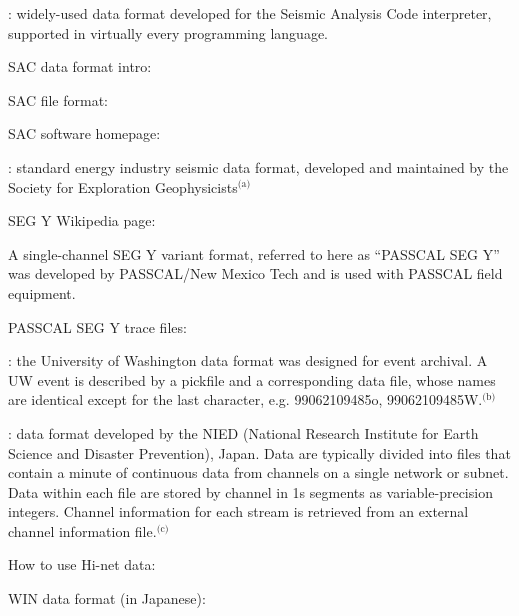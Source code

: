 \documentclass[letterpaper,11pt,english]{sphinxmanual}
\begin{document}
: widely-used data format developed for the Seismic Analysis Code interpreter, supported in virtually every programming language. %
\begin{footnote}[2]\sphinxAtStartFootnote
SAC data format intro: 
%
\end{footnote} %
\begin{footnote}[3]\sphinxAtStartFootnote
SAC file format: 
%
\end{footnote} %
\begin{footnote}[4]\sphinxAtStartFootnote
SAC software homepage: 
%
\end{footnote}

: standard energy industry seismic data format, developed and maintained by the Society for Exploration Geophysicists$^{\text{(a)}}$ %
\begin{footnote}[5]\sphinxAtStartFootnote
SEG Y Wikipedia page: 
%
\end{footnote} A single-channel SEG Y variant format, referred to here as “PASSCAL SEG Y” was developed by PASSCAL/New Mexico Tech and is used with PASSCAL field equipment. %
\begin{footnote}[6]\sphinxAtStartFootnote
PASSCAL SEG Y trace files: 
%
\end{footnote}

: the University of Washington data format was designed for event archival. A UW event is described by a pickfile and a corresponding data file, whose names are identical except for the last character, e.g. 99062109485o, 99062109485W.$^{\text{(b)}}$

 : data format developed by the NIED (National Research Institute for Earth Science and Disaster Prevention), Japan. Data are typically divided into files that contain a minute of continuous data from channels on a single network or subnet. Data within each file are stored by channel in 1s segments as variable-precision integers. Channel information for each stream is retrieved from an external channel information file.$^{\text{(c)}}$ %
\begin{footnote}[7]\sphinxAtStartFootnote
How to use Hi-net data: 
%
\end{footnote} %
\begin{footnote}[8]\sphinxAtStartFootnote
WIN data format (in Japanese): 
%
\end{footnote}
\end{document}
